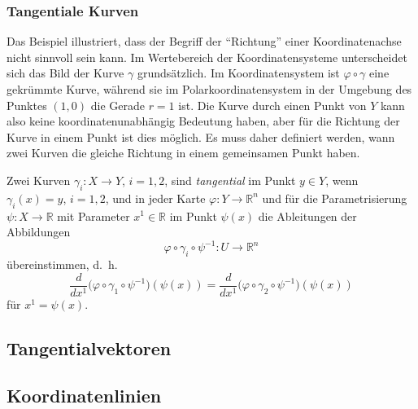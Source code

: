 


\subsubsection{Tangentiale Kurven}
Das Beispiel illustriert, dass der Begriff der ``Richtung'' einer
Koordinatenachse nicht sinnvoll sein kann.
Im Wertebereich der Koordinatensysteme unterscheidet sich das Bild
der Kurve $\gamma$ grundsätzlich.
Im Koordinatensystem ist $\varphi\circ\gamma$ eine gekrümmte Kurve,
während sie im Polarkoordinatensystem in der Umgebung des Punktes
$(1,0)$ die Gerade $r=1$ ist.
Die Kurve durch einen Punkt von $Y$ kann also keine koordinatenunabhängig
Bedeutung haben, aber für die Richtung der Kurve in einem Punkt ist
dies möglich.
Es muss daher definiert werden, wann zwei Kurven die gleiche Richtung
in einem gemeinsamen Punkt haben.


%

\begin{definition}
Zwei Kurven $\gamma_i\colon X\to Y$, $i=1,2$, sind
{\em tangential} im Punkt $y\in Y$, wenn
$\gamma_i(x) = y$, $i=1,2$, und
in jeder Karte
$\varphi\colon Y\to\mathbb{R}^n$ und für die Parametrisierung
$\psi\colon X\to \mathbb{R}$ mit Parameter $x^1\in\mathbb{R}$ 
im Punkt $\psi(x)$ die Ableitungen der Abbildungen
\[
\varphi
\circ
\gamma_i
\circ
\psi^{-1}
\colon
U\to\mathbb{R}^n
\]
übereinstimmen, d.~h.
\begin{equation}
\frac{d}{dx^1}
\bigl(\varphi\circ\gamma_1\circ\psi^{-1}\bigr)(\psi(x))
=
\frac{d}{dx^1}
\bigl(\varphi\circ\gamma_2\circ\psi^{-1}\bigr)(\psi(x))
\label{buch:koordinaten:tangentialvektoren:eqn:tangential}
\end{equation}
für $x^1=\psi(x)$.
\end{definition}

%
%
\subsection{Tangentialvektoren}

%
%
\subsection{Koordinatenlinien}



